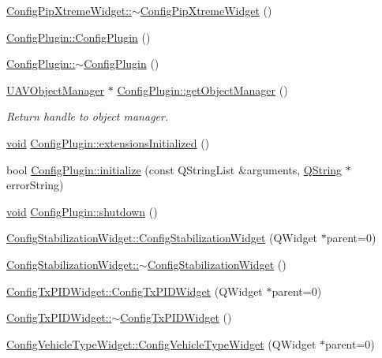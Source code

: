 \begin{DoxyCompactItemize}
\item 
\hyperlink{group___config_plugin_ga225924f55de51a2a536ad41dba22fbc2}{\-Config\-Pip\-Xtreme\-Widget\-::$\sim$\-Config\-Pip\-Xtreme\-Widget} ()
\item 
\hyperlink{group___config_plugin_ga7d360f4053aa997f911f4b8d5b9beddc}{\-Config\-Plugin\-::\-Config\-Plugin} ()
\item 
\hyperlink{group___config_plugin_gabe1cf1e86b64f31b77b147614d70cb2d}{\-Config\-Plugin\-::$\sim$\-Config\-Plugin} ()
\item 
\hyperlink{class_u_a_v_object_manager}{\-U\-A\-V\-Object\-Manager} $\ast$ \hyperlink{group___config_plugin_ga4b72a360021dcddf63bd9dc3566930bf}{\-Config\-Plugin\-::get\-Object\-Manager} ()
\begin{DoxyCompactList}\small\item\em \-Return handle to object manager. \end{DoxyCompactList}\item 
\hyperlink{group___u_a_v_objects_plugin_ga444cf2ff3f0ecbe028adce838d373f5c}{void} \hyperlink{group___config_plugin_gabbca0b710aa7b4870df57f979e248833}{\-Config\-Plugin\-::extensions\-Initialized} ()
\item 
bool \hyperlink{group___config_plugin_ga6caac2a6d708537fbabed44ad35e694f}{\-Config\-Plugin\-::initialize} (const \-Q\-String\-List \&arguments, \hyperlink{group___u_a_v_objects_plugin_gab9d252f49c333c94a72f97ce3105a32d}{\-Q\-String} $\ast$error\-String)
\item 
\hyperlink{group___u_a_v_objects_plugin_ga444cf2ff3f0ecbe028adce838d373f5c}{void} \hyperlink{group___config_plugin_gaf7af8833b63795f7bb96fd43bf74fb3e}{\-Config\-Plugin\-::shutdown} ()
\item 
\hyperlink{group___config_plugin_ga7ede076de26384e87d8b8357b391c0b6}{\-Config\-Stabilization\-Widget\-::\-Config\-Stabilization\-Widget} (\-Q\-Widget $\ast$parent=0)
\item 
\hyperlink{group___config_plugin_gaeca64ce80c3529dc40b452e3bcef2ffd}{\-Config\-Stabilization\-Widget\-::$\sim$\-Config\-Stabilization\-Widget} ()
\item 
\hyperlink{group___config_plugin_ga2ecc01b090b6955e7204c19432ad8628}{\-Config\-Tx\-P\-I\-D\-Widget\-::\-Config\-Tx\-P\-I\-D\-Widget} (\-Q\-Widget $\ast$parent=0)
\item 
\hyperlink{group___config_plugin_ga2c39980676875ea742391215e79d5262}{\-Config\-Tx\-P\-I\-D\-Widget\-::$\sim$\-Config\-Tx\-P\-I\-D\-Widget} ()
\item 
\hyperlink{group___config_plugin_ga073c5b646c2487874d095f97989f4358}{\-Config\-Vehicle\-Type\-Widget\-::\-Config\-Vehicle\-Type\-Widget} (\-Q\-Widget $\ast$parent=0)

\end{DoxyCompactItemize}
